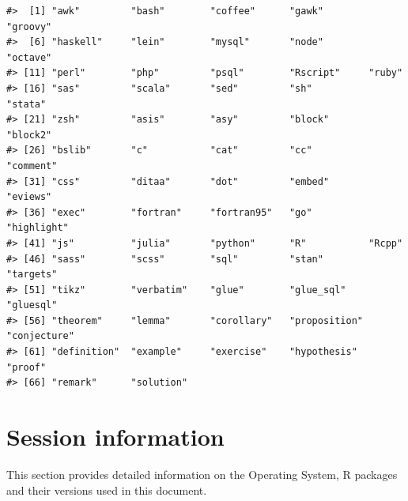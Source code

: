 \begin{verbatim}
#>  [1] "awk"         "bash"        "coffee"      "gawk"        "groovy"     
#>  [6] "haskell"     "lein"        "mysql"       "node"        "octave"     
#> [11] "perl"        "php"         "psql"        "Rscript"     "ruby"       
#> [16] "sas"         "scala"       "sed"         "sh"          "stata"      
#> [21] "zsh"         "asis"        "asy"         "block"       "block2"     
#> [26] "bslib"       "c"           "cat"         "cc"          "comment"    
#> [31] "css"         "ditaa"       "dot"         "embed"       "eviews"     
#> [36] "exec"        "fortran"     "fortran95"   "go"          "highlight"  
#> [41] "js"          "julia"       "python"      "R"           "Rcpp"       
#> [46] "sass"        "scss"        "sql"         "stan"        "targets"    
#> [51] "tikz"        "verbatim"    "glue"        "glue_sql"    "gluesql"    
#> [56] "theorem"     "lemma"       "corollary"   "proposition" "conjecture" 
#> [61] "definition"  "example"     "exercise"    "hypothesis"  "proof"      
#> [66] "remark"      "solution"
\end{verbatim}

\hypertarget{session-information}{%
\section{Session information}\label{session-information}}

This section provides detailed information on the Operating System, R packages and their versions used in this document.

